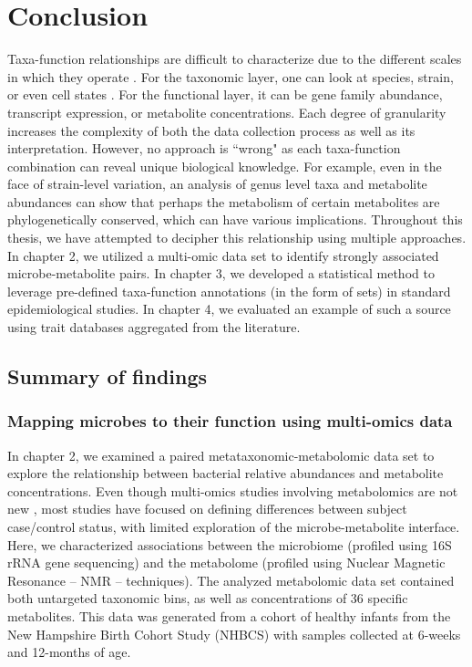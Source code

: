 \chapter{Conclusion}

Taxa-function relationships are difficult to characterize due to the different scales in which they operate \cite{langille2018exploring}. For the taxonomic layer, one can look at species, strain, or even cell states \cite{mcnulty2021dropletbased}. For the functional layer, it can be gene family abundance, transcript expression, or metabolite concentrations. Each degree of granularity increases the complexity of both the data collection process as well as its interpretation. However, no approach is ``wrong" as each taxa-function combination can reveal unique biological knowledge. For example, even in the face of strain-level variation, an analysis of genus level taxa and metabolite abundances can show that perhaps the metabolism of certain metabolites are phylogenetically conserved, which can have various implications. Throughout this thesis, we have attempted to decipher this relationship using multiple approaches. In chapter 2, we utilized a multi-omic data set to identify strongly associated microbe-metabolite pairs. In chapter 3, we developed a statistical method to leverage pre-defined taxa-function annotations (in the form of sets) in standard epidemiological studies. In chapter 4, we evaluated an example of such a source using trait databases aggregated from the literature.  

\section{Summary of findings}
\subsection{Mapping microbes to their function using multi-omics data}

In chapter 2, we examined a paired metataxonomic-metabolomic data set to explore the relationship between bacterial relative abundances and metabolite concentrations. Even though multi-omics studies involving metabolomics are not new \cite{lloyd-price2019multiomics, ayeni2018infant, kisuse2018urban}, most studies have focused on defining differences between subject case/control status, with limited exploration of the microbe-metabolite interface. Here, we characterized associations between the microbiome (profiled using 16S rRNA gene sequencing) and the metabolome (profiled using Nuclear Magnetic Resonance -- NMR -- techniques). The analyzed metabolomic data set contained both untargeted taxonomic bins, as well as  concentrations of 36 specific metabolites. This data was generated from a cohort of healthy infants from the New Hampshire Birth Cohort Study (NHBCS) \cite{gilbert-diamond2011rice} with samples collected at 6-weeks and 12-months of age. 

